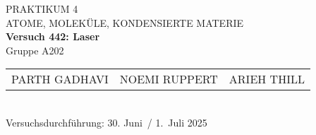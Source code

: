 \documentclass[%
paper=a4,       %
fontsize=11pt,  %
ngerman         %
]{scrreprt}
\begin{document}
\begin{titlepage}
  \centering
  \vspace*{2cm}
  
  {\Large PRAKTIKUM 4}\\[0.5cm]
  {\large ATOME, MOLEKÜLE, KONDENSIERTE MATERIE}\\[1cm]
  
  {\LARGE\bfseries Versuch 442: Laser}\\[1cm]
  
  Gruppe A202\\[1cm]
  
  \begin{tabular}{lll}
    PARTH GADHAVI   & NOEMI RUPPERT   & ARIEH THILL \\
  \end{tabular}\\[2cm]
  
  Versuchsdurchführung: 30. Juni~/ 1.~Juli 2025
  
  \vfill
\end{titlepage}

\tableofcontents
\clearpage
\clearpage
\setcounter{page}{1}
 
 
 
% 
 
% 
 

\appendix
\printbibliography{}
\end{document}
